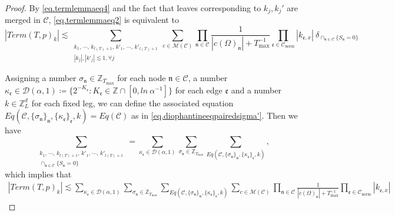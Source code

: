\begin{proof}
By \eqref{eq.termlemmaeq4} and the fact that leaves corresponding to $k_j, k_j'$ are merged in $\mathcal{C}$, \eqref{eq.termlemmaeq2} is equivalent to 
\begin{equation}\label{eq.termlemmaeq5}
|Term(T, p)_k|\lesssim \sum_{\substack{k_1,\, \cdots,\, k_{l(T)+1},\, k'_1,\, \cdots,\, k'_{l(T)+1}\\ |k_{j}|, |k'_j|\lesssim 1, \forall j}} \sum_{c\in \mathscr{M}(\mathcal{C}) }\prod_{\mathfrak{n}\in \mathcal{C}}\frac{1}{|c(\Omega)_{\mathfrak{n}}|+T^{-1}_{\text{max}}} \prod_{\mathfrak{e}\in \mathcal{C}_{\text{norm}}}|k_{\mathfrak{e},x}|\ \delta_{\cap_{\mathfrak{n}\in \mathcal{C}} \{S_{\mathfrak{n}}=0\}}
\end{equation}


Assigning a number $\sigma_{\mathfrak{n}}\in \mathbb{Z}_{T_{\text{max}}}$ for each node $\mathfrak{n}\in \mathcal{C}$, a number $\kappa_{\mathfrak{e}}\in \mathcal{D}(\alpha,1)\coloneqq\{2^{-K_{\mathfrak{e}}}:K_{\mathfrak{e}}\in  \mathbb{Z}\cap [0,ln\ \alpha^{-1}]\}$ for each edge $\mathfrak{e}$ and a number $k\in \mathbb{Z}^d_{L}$ for each fixed leg, we can define the associated equation $Eq(\mathcal{C}, \{\sigma_{\mathfrak{n}}\}_{\mathfrak{n}}, \{\kappa_{\mathfrak{e}}\}_{\mathfrak{e}},k)=Eq(\mathcal{C})$ as in \eqref{eq.diophantineeqpairedsigma'}. Then we have  
\begin{equation}\label{eq.termlemmaeq8}
    \sum_{\substack{k_1,\, \cdots,\, k_{l(T)+1},\, k'_1,\, \cdots,\, k'_{l(T)+1}\\\cap_{\mathfrak{n}\in \mathcal{C}} \{S_{\mathfrak{n}}=0\}}}=\sum_{\kappa_{\mathfrak{e}}\in \mathcal{D}(\alpha,1)}\sum_{\sigma_{\mathfrak{n}}\in \mathbb{Z}_{T_{\text{max}}}}\sum_{Eq(\mathcal{C}, \{\sigma_{\mathfrak{n}}\}_{\mathfrak{n}}, \{\kappa_{\mathfrak{e}}\}_{\mathfrak{e}},k)},
\end{equation}
which implies that
\begin{equation}\label{eq.termlemmaeq6}
\begin{split}
    |Term(T, p)_k|\lesssim \sum_{\kappa_{\mathfrak{e}}\in \mathcal{D}(\alpha,1)}\sum_{\sigma_{\mathfrak{n}}\in \mathbb{Z}_{T_{\text{max}}}}\sum_{Eq(\mathcal{C}, \{\sigma_{\mathfrak{n}}\}_{\mathfrak{n}}, \{\kappa_{\mathfrak{e}}\}_{\mathfrak{e}},k)} \sum_{c\in \mathscr{M}(\mathcal{C}) }\prod_{\mathfrak{n}\in \mathcal{C}}\frac{1}{|c(\Omega)_{\mathfrak{n}}|+T^{-1}_{\text{max}}} \prod_{\mathfrak{e}\in \mathcal{C}_{\text{norm}}}|k_{\mathfrak{e},x}|
\end{split}
\end{equation}

\end{proof}
